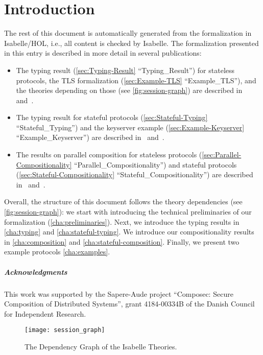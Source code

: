 \documentclass[10pt,DIV16,a4paper,abstract=true,twoside=semi,openright]
{scrreprt}
\begin{document}
\chapter{Introduction}
The rest of this document is automatically generated from the formalization in Isabelle/HOL, i.e., all content is checked by Isabelle.
The formalization presented in this entry is described in more detail in several publications:
\begin{itemize}
\item The typing result (\autoref{sec:Typing-Result} ``Typing\_Result'') for stateless protocols, the TLS formalization (\autoref{sec:Example-TLS} ``Example\_TLS''), and the theories depending on those (see \autoref{fig:session-graph}) are described in~\cite{hess.ea:formalizing:2017} and~\cite[chapter 3]{hess:typing:2018}.
\item The typing result for stateful protocols (\autoref{sec:Stateful-Typing} ``Stateful\_Typing'') and the keyserver example (\autoref{sec:Example-Keyserver} ``Example\_Keyserver'') are described in~\cite{hess.ea:typing:2018} and~\cite[chapter 4]{hess:typing:2018}.
\item The results on parallel composition for stateless protocols (\autoref{sec:Parallel-Compositionality} ``Parallel\_Compositionality'') and stateful protocols (\autoref{sec:Stateful-Compositionality} ``Stateful\_Compositionality'') are described in~\cite{hess.ea:stateful-protocol-composition:2023,hess.ea:stateful:2018} and~\cite[chapter 5]{hess:typing:2018}.
\end{itemize}
Overall, the structure of this document follows the theory dependencies (see \autoref{fig:session-graph}): we start with introducing the technical preliminaries of our formalization (\autoref{cha:preliminaries}).
Next, we introduce the typing results in \autoref{cha:typing} and \autoref{cha:stateful-typing}.
We introduce our compositionality results in \autoref{cha:composition} and \autoref{cha:stateful-composition}.
Finally, we present two example protocols \autoref{cha:examples}.

\paragraph{Acknowledgments}
This work was supported by the Sapere-Aude project ``Composec: Secure Composition of Distributed Systems'', grant 4184-00334B of the Danish Council for Independent Research.

\clearpage

\begin{figure}
  \centering
  \texttt{[image: session\_graph]}
  \caption{The Dependency Graph of the Isabelle Theories.\label{fig:session-graph}}
\end{figure}
\end{document}
